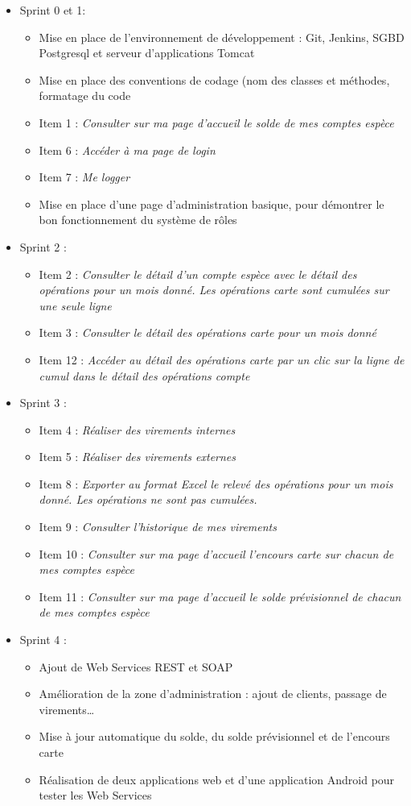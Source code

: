 \begin{itemize}
	\item Sprint 0 et 1:
	\begin{itemize}
		\item Mise en place de l'environnement de développement : Git, Jenkins, SGBD Postgresql et serveur d'applications Tomcat
		\item Mise en place des conventions de codage (nom des classes et méthodes, formatage du code
		 \item Item 1 : \textit{Consulter sur ma page d’accueil le solde de mes comptes espèce}
		 \item Item 6 : \textit{Accéder à ma page de login}
		 \item Item 7 : \textit{Me logger}
		 \item Mise en place d'une page d'administration basique, pour démontrer le bon fonctionnement du système de rôles 
	\end{itemize}
	\item Sprint 2 :
	\begin{itemize}
		\item Item 2 : \textit{Consulter le détail d'un compte espèce avec le détail des opérations pour un mois donné. Les opérations carte sont cumulées sur une seule ligne}
		\item Item 3 : \textit{Consulter le détail des opérations carte pour un mois donné}
		\item Item 12 : \textit{Accéder au détail des opérations carte par un clic sur la ligne de cumul dans le détail des opérations compte}
	\end{itemize}
	\item Sprint 3 : 
	\begin{itemize}
		\item Item 4 : \textit{Réaliser des virements internes}
		\item Item 5 : \textit{Réaliser des virements externes}
		\item Item 8 : \textit{Exporter au format Excel le relevé des opérations pour un mois donné. Les opérations ne sont pas cumulées.}
		\item Item 9 : \textit{Consulter l'historique de mes virements}
		\item Item 10 : \textit{Consulter sur ma page d'accueil l'encours carte sur chacun de mes comptes espèce}
		\item Item 11 : \textit{Consulter sur ma page d'accueil le solde prévisionnel de chacun de mes comptes espèce}
	\end{itemize}
	\item Sprint 4 :
	\begin{itemize}
		\item Ajout de Web Services REST et SOAP
		\item Amélioration de la zone d'administration : ajout de clients, passage de virements\ldots
		\item Mise à jour automatique du solde, du solde prévisionnel et de l'encours carte
		\item Réalisation de deux applications web et d'une application Android pour tester les Web Services
	\end{itemize}
\end{itemize}
